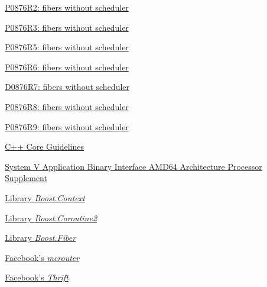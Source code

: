 \begin{thebibliography}{99}
        \href{http://www.open-std.org/jtc1/sc22/wg21/docs/papers/2018/p0876r2.pdf}
        {P0876R2: fibers without scheduler}

        \href{http://www.open-std.org/jtc1/sc22/wg21/docs/papers/2018/p0876r3.pdf}
        {P0876R3: fibers without scheduler}

        \href{http://www.open-std.org/jtc1/sc22/wg21/docs/papers/2019/p0876r5.pdf}
        {P0876R5: fibers without scheduler}

        \href{http://www.open-std.org/jtc1/sc22/wg21/docs/papers/2019/p0876r6.pdf}
        {P0876R6: fibers without scheduler}

        \href{http://wiki.edg.com/pub/Wg21cologne2019/SG1/D0876R7.pdf}
        {D0876R7: fibers without scheduler}

        \href{http://www.open-std.org/jtc1/sc22/wg21/docs/papers/2019/p0876r8.pdf}
        {P0876R8: fibers without scheduler}

        \href{http://www.open-std.org/jtc1/sc22/wg21/docs/papers/2019/p0876r9.pdf}
        {P0876R9: fibers without scheduler}

        \href{http://isocpp.github.io/CppCoreGuidelines/CppCoreGuidelines#Ri-global}
        {C++ Core Guidelines}

        \href{http://software.intel.com/sites/default/files/article/402129/mpx-linux64-abi.pdf}
        {System V Application Binary Interface AMD64 Architecture Processor
        Supplement}

        \href{http://www.boost.org/doc/libs/release/libs/context/doc/html/index.html}
        {Library \emph{Boost.Context}}

        \href{http://www.boost.org/doc/libs/release/libs/coroutine2/doc/html/index.html}
        {Library \emph{Boost.Coroutine2}}

        \href{http://www.boost.org/doc/libs/release/libs/fiber/doc/html/index.html}
        {Library \emph{Boost.Fiber}}

        \href{https://code.facebook.com/posts/296442737213493/introducing-mcrouter-a-memcached-protocol-router-for-scaling-memcached-deployments}
        {Facebook's \emph{mcrouter}}

        \href{https://github.com/facebook/fbthrift}
        {Facebook's \emph{Thrift}}


\end{thebibliography}
